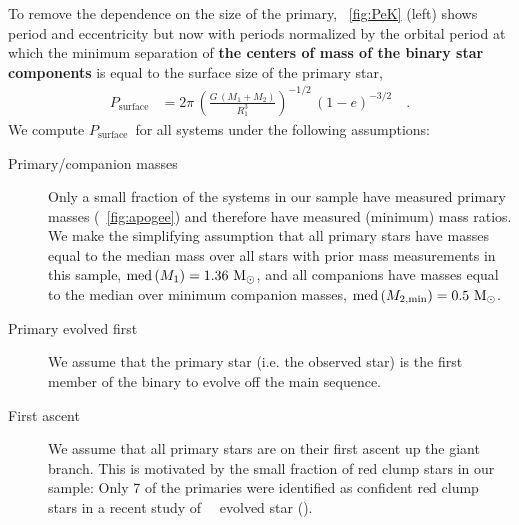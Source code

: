 \documentclass[modern, letterpaper]{aastex62}
\newcommand{\apogee}{\project{\acronym{APOGEE}}}
\newcommand{\DR}{\acronym{DR14}}
\newcommand{\med}[1]{\ensuremath{\textrm{med}\left(#1\right)}}
\newcommand{\Psurf}{\ensuremath{P_\textrm{surface}}}
\renewcommand{\changes}[1]{\textbf{#1}}
\begin{document}
To remove the dependence on the size of the primary, \figurename~\ref{fig:PeK}
(left) shows period and eccentricity but now with periods normalized by the
orbital period at which the minimum separation of \changes{the centers of mass
of the binary star components} is equal to the surface size of the primary star,
\begin{align}
    \Psurf &= 2\pi \,
        \left(\frac{G \, (M_1+M_2)}{R_1^3}\right)^{-1/2} \,
        \left(1-e\right)^{-3/2}
    \quad . \label{eq:Psurf}
\end{align}
We compute \Psurf\ for all systems under the following assumptions:
\begin{description}
    \item[Primary/companion masses] Only a small fraction of the systems in our
    sample have measured primary masses (\figurename~\ref{fig:apogee}) and
    therefore have measured (minimum) mass ratios.
    We make the simplifying assumption that all primary stars have masses equal
    to the median mass over all stars with prior mass measurements in this
    sample, $\med{M_1} = 1.36~\msun$, and all companions have masses equal to
    the median over minimum companion masses, $\med{M_{2, \textrm{min}}} =
    0.5~\msun$.
    \item[Primary evolved first] We assume that the primary star (i.e. the
    observed star) is the first member of the binary to evolve off the main
    sequence.
    \item[First ascent] We assume that all primary stars are on their first
    ascent up the giant branch.
    This is motivated by the small fraction of red clump stars in our sample:
    Only 7 of the primaries were identified as confident red clump stars in a
    recent study of \apogee\ \DR\ evolved star (\citealt{Ting:2018}).
\end{description}
\end{document}
